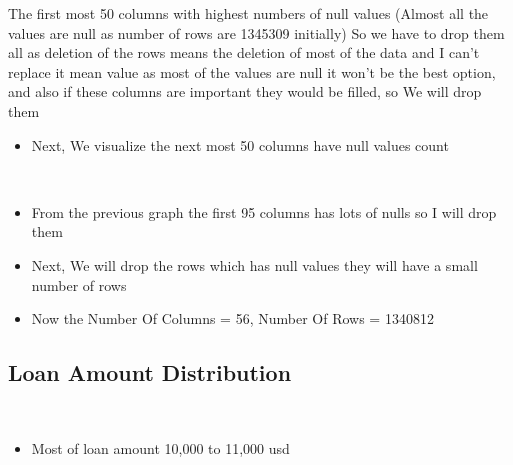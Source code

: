 \documentclass[11pt]{article}
\providecommand{\tightlist}{%
      \setlength{\itemsep}{0pt}\setlength{\parskip}{0pt}}
\begin{document}
    The first most 50 columns with highest numbers of null values (Almost
all the values are null as number of rows are 1345309 initially) So we
have to drop them all as deletion of the rows means the deletion of most
of the data and I can't replace it mean value as most of the values are
null it won't be the best option, and also if these columns are
important they would be filled, so We will drop them

    \begin{itemize}
\tightlist
\item
  Next, We visualize the next most 50 columns have null values count
\end{itemize}

    \begin{center}
    \end{center}
    { \hspace*{\fill} \\}
    
    \begin{itemize}
\tightlist
\item
  From the previous graph the first 95 columns has lots of nulls so I
  will drop them
\item
  Next, We will drop the rows which has null values they will have a
  small number of rows
\item
  Now the Number Of Columns = 56, Number Of Rows = 1340812
\end{itemize}

    \hypertarget{loan-amount-distribution}{%
\subsection{Loan Amount Distribution}\label{loan-amount-distribution}}

    \begin{center}
    \end{center}
    { \hspace*{\fill} \\}
    
    \begin{itemize}
\tightlist
\item
  Most of loan amount 10,000 to 11,000 usd
\end{itemize}

    \begin{center}
    \end{center}
    { \hspace*{\fill} \\}
    
\end{document}
